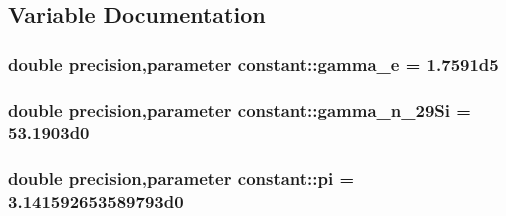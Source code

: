 \subsection{Variable Documentation}
\hypertarget{namespaceconstant_ad70145ef05b91abf89de0761cb859778}{
\subsubsection[{gamma\_\-e}]{\setlength{\rightskip}{0pt plus 5cm}double precision,parameter {\bf constant::gamma\_\-e} = 1.7591d5}}
\label{namespaceconstant_ad70145ef05b91abf89de0761cb859778}
\hypertarget{namespaceconstant_aed9a4589c9352f948ca62e1499046b8c}{
\subsubsection[{gamma\_\-n\_\-29Si}]{\setlength{\rightskip}{0pt plus 5cm}double precision,parameter {\bf constant::gamma\_\-n\_\-29Si} = 53.1903d0}}
\label{namespaceconstant_aed9a4589c9352f948ca62e1499046b8c}
\hypertarget{namespaceconstant_ae6f370ef8cc1a7c38a6ddf8505ac480d}{
\subsubsection[{pi}]{\setlength{\rightskip}{0pt plus 5cm}double precision,parameter {\bf constant::pi} = 3.141592653589793d0}}
\label{namespaceconstant_ae6f370ef8cc1a7c38a6ddf8505ac480d}

